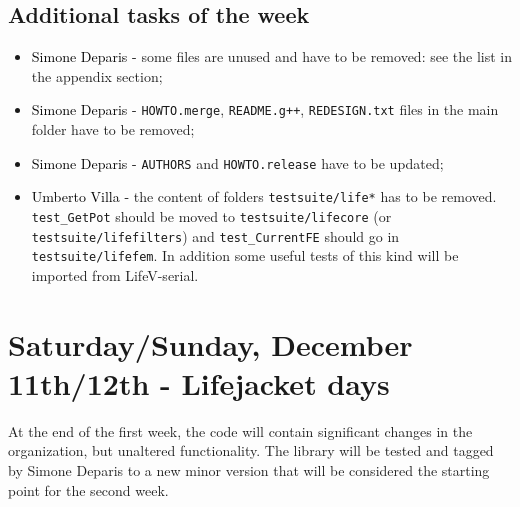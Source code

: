 \documentclass[10p]{article}
\newcommand{\newparts}[1]{\textcolor{black}{#1}}
\theoremstyle{definition}
\begin{document}
\subsection*{Additional tasks of the week }
\begin{itemize}
  \item \newparts{Simone Deparis - } some files are unused and have to be removed: see the list in the appendix section;
  \item \newparts{Simone Deparis -} \texttt{HOWTO.merge}, \texttt{README.g++}, \texttt{REDESIGN.txt} files in the main folder have to be removed;
  \item \newparts{Simone Deparis -} \texttt{AUTHORS} and \texttt{HOWTO.release} have to be updated;
  \item \newparts{Umberto Villa -} the content of folders \texttt{testsuite/life*} has to be removed. \texttt{test\_GetPot} should be moved to \texttt{testsuite/lifecore} (or \texttt{testsuite/lifefilters}) and \texttt{test\_CurrentFE} should go in \texttt{testsuite/lifefem}. In addition some useful tests of this kind will be imported from LifeV-serial.
\end{itemize}




\section*{Saturday/Sunday, December 11th/12th - Lifejacket days}
At the end of the first week, the code will contain significant changes in the organization, but unaltered functionality. The library will be tested and tagged by Simone Deparis to a new minor version that will be considered the starting point for the second week.
\end{document}
